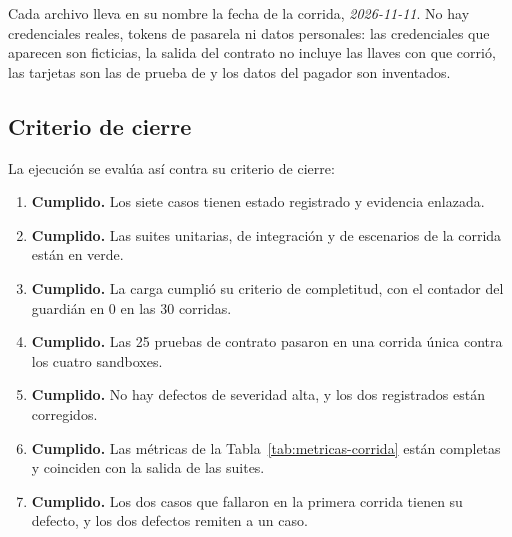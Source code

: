 Cada archivo lleva en su nombre la fecha de la corrida, \emph{2026-11-11}. No hay credenciales reales, tokens de pasarela ni datos personales: las credenciales que aparecen son ficticias, la salida del contrato no incluye las llaves con que corrió, las tarjetas son las de prueba de  y los datos del pagador son inventados.

\subsection{Criterio de cierre}

La ejecución se evalúa así contra su criterio de cierre:

\begin{enumerate}
  \item \textbf{Cumplido.} Los siete casos tienen estado registrado y evidencia enlazada.
  \item \textbf{Cumplido.} Las suites unitarias, de integración y de escenarios de la corrida están en verde.
  \item \textbf{Cumplido.} La carga cumplió su criterio de completitud, con el contador del guardián en 0 en las 30 corridas.
  \item \textbf{Cumplido.} Las 25 pruebas de contrato pasaron en una corrida única contra los cuatro sandboxes.
  \item \textbf{Cumplido.} No hay defectos de severidad alta, y los dos registrados están corregidos.
  \item \textbf{Cumplido.} Las métricas de la Tabla~\ref{tab:metricas-corrida} están completas y coinciden con la salida de las suites.
  \item \textbf{Cumplido.} Los dos casos que fallaron en la primera corrida tienen su defecto, y los dos defectos remiten a un caso.
\end{enumerate}

